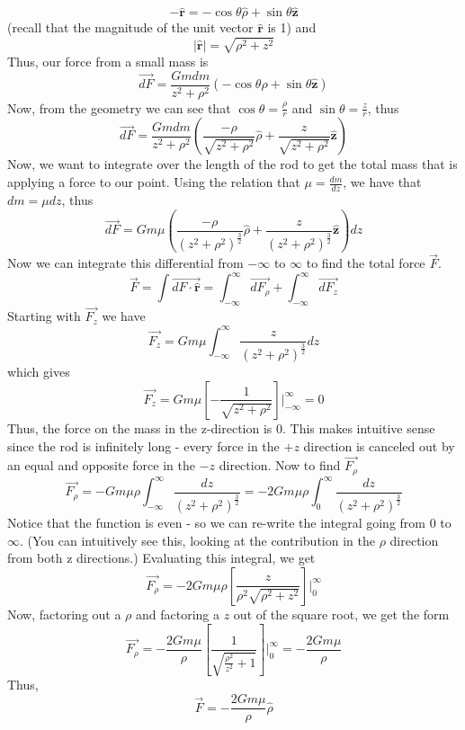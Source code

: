 \documentclass{article}
\newcommand{\uvec}[1]{\boldsymbol{\hat{\textbf{#1}}}}
\begin{document}
$$
-\uvec{r} = -\cos\theta\hat{\rho} + \sin\theta\uvec{z}
$$
(recall that the magnitude of the unit vector $\uvec{r}$ is 1) and
$$
|\uvec{r}| = \sqrt{\rho^2 + z^2}
$$
Thus, our force from a small mass is
$$
\vec{dF} = \frac{Gm dm}{z^2+\rho^2}(-\cos \theta \hat{\rho} + \sin \theta \uvec{z})
$$
Now, from the geometry we can see that $\cos \theta = \frac{\rho}{r}$ and $\sin \theta = \frac{z}{r}$, thus
$$
\vec{dF} = \frac{Gm dm}{z^2+\rho^2}\left(\frac{-\rho}{\sqrt{z^2 + \rho^2}} \hat{\rho} + \frac{z}{\sqrt{z^2 + \rho^2} }\uvec{z}\right)
$$
Now, we want to integrate over the length of the rod to get the total mass that is applying a force to our point.  Using the relation that $\mu = \frac{dm}{dz}$, we have that $dm = \mu dz$, thus
$$
\vec{dF} = Gm\mu\left(\frac{-\rho}{(z^2 + \rho^2)^\frac{3}{2}} \hat{\rho} + \frac{z}{(z^2 + \rho^2)^\frac{3}{2}}\uvec{z}\right)dz
$$
Now we can integrate this differential from $-\infty$ to $\infty$ to find the total force $\vec{F}$.
$$
\vec{F} = \int \vec{dF \cdot \uvec{r}} = \int_{-\infty}^{\infty}\vec{dF_{\rho}} + \int_{-\infty}^{\infty}\vec{dF_{z}}
$$
Starting with $\vec{F_{z}}$ we have
$$
\vec{F_{z}} = Gm\mu\int_{-\infty}^{\infty}\frac{z}{(z^2 + \rho^2)^\frac{3}{2}}dz
$$
which gives
$$
\vec{F_{z}} = Gm\mu\left[-\frac{1}{\sqrt{z^2+\rho^2}}\right] \rvert_{-\infty}^{\infty} = 0
$$
Thus, the force on the mass in the z-direction is 0.  This makes intuitive sense since the rod is infinitely long - every force in the $+z$ direction is canceled out by an equal and opposite force in the $-z$ direction. 
\newline
\newline
\noindent Now to find $\vec{F_{\rho}}$
$$
\vec{F_{\rho}} = -Gm\mu\rho \int_{-\infty}^{\infty} \frac{dz}{(z^2 + \rho^2)^\frac{3}{2}} = -2Gm\mu\rho \int_{0}^{\infty} \frac{dz}{(z^2 + \rho^2)^\frac{3}{2}} 
$$
Notice that the function is even - so we can re-write the integral going from 0 to $\infty$. (You can intuitively see this, looking at the contribution in the $\rho$ direction from both z directions.) Evaluating this integral, we get
$$
\vec{F_{\rho}} = -2Gm\mu\rho\left[\frac{z}{\rho^2\sqrt{\rho^2 + z^2}}\right]\rvert_{0}^{\infty}
$$
Now, factoring out a $\rho$ and factoring a $z$ out of the square root, we get the form
$$
\vec{F_{\rho}} = -\frac{2Gm\mu}{\rho}\left[\frac{1}{\sqrt{\frac{\rho^2}{z^2} + 1}}\right]\rvert_{0}^{\infty} = -\frac{2Gm\mu}{\rho}
$$
Thus,
$$
\vec{F} = -\frac{2Gm\mu}{\rho}\hat{\rho}
$$
\end{document}

